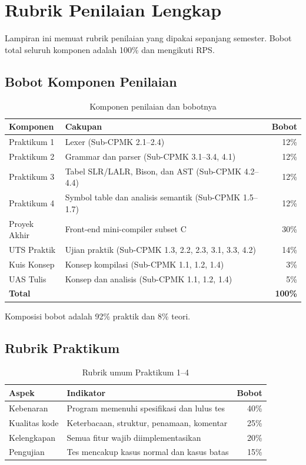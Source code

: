 \chapter{Rubrik Penilaian Lengkap}
\label{app:rubrik}

Lampiran ini memuat rubrik penilaian yang dipakai sepanjang semester.
Bobot total seluruh komponen adalah 100\% dan mengikuti RPS.

\section{Bobot Komponen Penilaian}
\label{app:rubrik-bobot}

\begin{table}[H]
\centering
\caption{Komponen penilaian dan bobotnya}
\label{tab:app-bobot}
\begin{tabularx}{\textwidth}{@{}lXr@{}}
\toprule
\textbf{Komponen} & \textbf{Cakupan} & \textbf{Bobot} \\
\midrule
Praktikum 1 & Lexer (Sub-CPMK 2.1--2.4) & 12\% \\
Praktikum 2 & Grammar dan parser (Sub-CPMK 3.1--3.4, 4.1) & 12\% \\
Praktikum 3 & Tabel SLR/LALR, Bison, dan AST (Sub-CPMK 4.2--4.4) & 12\% \\
Praktikum 4 & Symbol table dan analisis semantik (Sub-CPMK 1.5--1.7) & 12\% \\
Proyek Akhir & Front-end mini-compiler subset C & 30\% \\
UTS Praktik & Ujian praktik (Sub-CPMK 1.3, 2.2, 2.3, 3.1, 3.3, 4.2) & 14\% \\
Kuis Konsep & Konsep kompilasi (Sub-CPMK 1.1, 1.2, 1.4) & 3\% \\
UAS Tulis & Konsep dan analisis (Sub-CPMK 1.1, 1.2, 1.4) & 5\% \\
\midrule
\textbf{Total} & & \textbf{100\%} \\
\bottomrule
\end{tabularx}
\end{table}

Komposisi bobot adalah 92\% praktik dan 8\% teori.

\section{Rubrik Praktikum}
\label{app:rubrik-praktikum}

\begin{table}[H]
\centering
\caption{Rubrik umum Praktikum 1--4}
\label{tab:app-rubrik-praktikum}
\begin{tabularx}{\textwidth}{@{}lXr@{}}
\toprule
\textbf{Aspek} & \textbf{Indikator} & \textbf{Bobot} \\
\midrule
Kebenaran & Program memenuhi spesifikasi dan lulus tes & 40\% \\
Kualitas kode & Keterbacaan, struktur, penamaan, komentar & 25\% \\
Kelengkapan & Semua fitur wajib diimplementasikan & 20\% \\
Pengujian & Tes mencakup kasus normal dan kasus batas & 15\% \\
\bottomrule
\end{tabularx}
\end{table}

